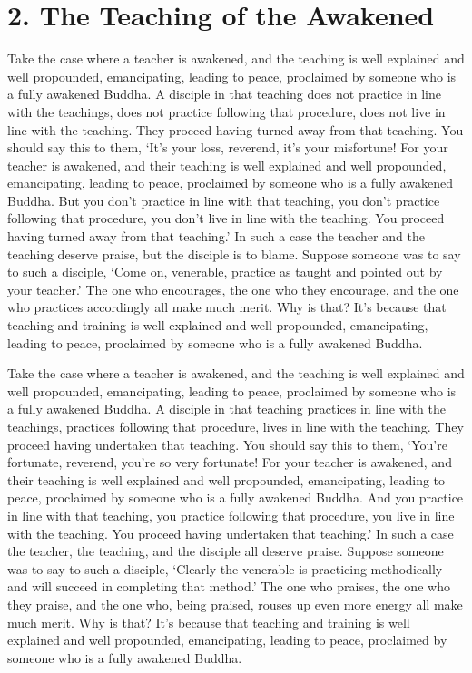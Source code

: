 \documentclass[12pt,openany]{book}%
\begin{document}
\section*{2. The Teaching of the Awakened }

Take the case where a teacher is awakened, and the teaching is well explained and well propounded, emancipating, leading to peace, proclaimed by someone who is a fully awakened Buddha. A disciple in that teaching does not practice in line with the teachings, does not practice following that procedure, does not live in line with the teaching. They proceed having turned away from that teaching. You should say this to them, ‘It’s your loss, reverend, it’s your misfortune! For your teacher is awakened, and their teaching is well explained and well propounded, emancipating, leading to peace, proclaimed by someone who is a fully awakened Buddha. But you don’t practice in line with that teaching, you don’t practice following that procedure, you don’t live in line with the teaching. You proceed having turned away from that teaching.’ In such a case the teacher and the teaching deserve praise, but the disciple is to blame. Suppose someone was to say to such a disciple, ‘Come on, venerable, practice as taught and pointed out by your teacher.’ The one who encourages, the one who they encourage, and the one who practices accordingly all make much merit. Why is that? It’s because that teaching and training is well explained and well propounded, emancipating, leading to peace, proclaimed by someone who is a fully awakened Buddha. 

Take the case where a teacher is awakened, and the teaching is well explained and well propounded, emancipating, leading to peace, proclaimed by someone who is a fully awakened Buddha. A disciple in that teaching practices in line with the teachings, practices following that procedure, lives in line with the teaching. They proceed having undertaken that teaching. You should say this to them, ‘You’re fortunate, reverend, you’re so very fortunate! For your teacher is awakened, and their teaching is well explained and well propounded, emancipating, leading to peace, proclaimed by someone who is a fully awakened Buddha. And you practice in line with that teaching, you practice following that procedure, you live in line with the teaching. You proceed having undertaken that teaching.’ In such a case the teacher, the teaching, and the disciple all deserve praise. Suppose someone was to say to such a disciple, ‘Clearly the venerable is practicing methodically and will succeed in completing that method.’ The one who praises, the one who they praise, and the one who, being praised, rouses up even more energy all make much merit. Why is that? It’s because that teaching and training is well explained and well propounded, emancipating, leading to peace, proclaimed by someone who is a fully awakened Buddha. 
\end{document}
